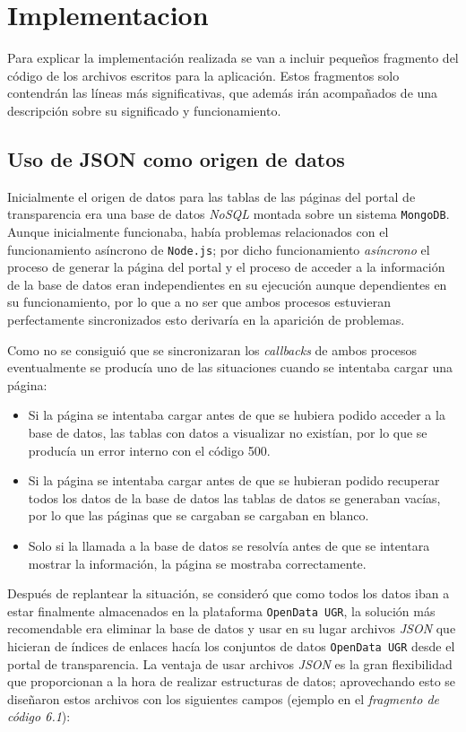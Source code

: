 \chapter{Implementacion}
 
 Para explicar la implementación realizada se van a incluir pequeños fragmento del código de los archivos escritos para la aplicación. Estos fragmentos solo contendrán las líneas más significativas, que además irán acompañados de una descripción sobre su significado y funcionamiento.
 
\section{Uso de JSON como origen de datos}
 
Inicialmente el origen de datos para las tablas de las páginas del portal de transparencia era una base de datos \textit{NoSQL} montada sobre un sistema {\tt MongoDB}. Aunque inicialmente funcionaba, había problemas relacionados con el funcionamiento asíncrono de {\tt Node.js}; por dicho funcionamiento \textit{asíncrono} el proceso de generar la página del portal y el proceso de acceder a la información de la base de datos eran independientes en su ejecución aunque dependientes en su funcionamiento, por lo que a no ser que ambos procesos estuvieran perfectamente sincronizados esto derivaría en la aparición de problemas.

\bigskip
Como no se consiguió que se sincronizaran los \textit{callbacks} de ambos procesos eventualmente se producía uno de las situaciones cuando se intentaba cargar una página:

\begin{itemize}
	\item Si la página se intentaba cargar antes de que se hubiera podido acceder a la base de datos, las tablas con datos a visualizar no existían, por lo que se producía un error interno con el código 500.
	\item Si la página se intentaba cargar antes de que se hubieran podido recuperar todos los datos de la base de datos las tablas de datos se generaban vacías, por lo que las páginas que se cargaban se cargaban en blanco.
	\item Solo si la llamada a la base de datos se resolvía antes de que se intentara mostrar la información, la página se mostraba correctamente. 
\end{itemize}

Después de replantear la situación, se consideró que como todos los datos iban a estar finalmente almacenados en la plataforma {\tt OpenData UGR}, la solución más recomendable era eliminar la base de datos y usar en su lugar archivos \textit{JSON} que hicieran de índices de enlaces hacía los conjuntos de datos {\tt OpenData UGR} desde el portal de transparencia. La ventaja de usar archivos \textit{JSON} es la gran flexibilidad que proporcionan a la hora de realizar estructuras de datos; aprovechando esto se diseñaron estos archivos con los siguientes campos (ejemplo en el \textit{fragmento de código 6.1}):

